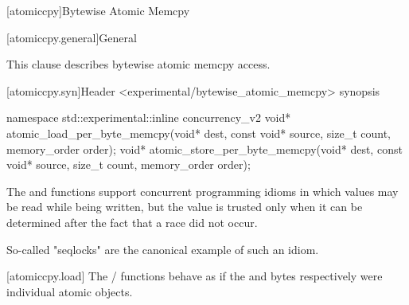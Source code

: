
[atomiccpy]{Bytewise Atomic Memcpy}

[atomiccpy.general]{General}

This clause describes bytewise atomic memcpy access. 


[atomiccpy.syn]{Header <experimental/bytewise_atomic_memcpy> synopsis}

\begin{codeblock}
namespace std::experimental::inline concurrency_v2 {
  void* atomic_load_per_byte_memcpy(void* dest, const void* source, size_t count, memory_order order);
  void* atomic_store_per_byte_memcpy(void* dest, const void* source, size_t count, memory_order order);
}
\end{codeblock}

\pnum

The  and
 functions support concurrent
programming idioms in which values may be read while being written, but
the value is trusted only when it can be determined after the fact that
a race did not occur. \begin{note} So-called "seqlocks" are the canonical
example of such an idiom. \end{note}


[atomiccpy.load]{}
\pnum
The  /
 functions behave as if the
 and  bytes respectively were individual
atomic objects.

\textbf{}

